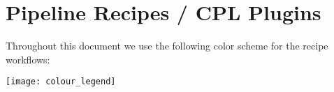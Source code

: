 \clearpage

\section{Pipeline Recipes / CPL Plugins}
\label{sec:pipeline_recipes}

Throughout this document we use the following color scheme for the
recipe workflows:
\begin{center}
  \texttt{[image: colour\_legend]}
\end{center}










